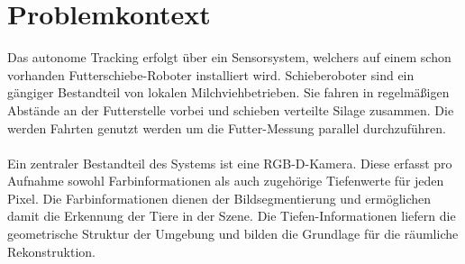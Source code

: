 \documentclass[12pt,DIV=15,BCOR=15mm,twoside,headsepline,abstract=true,listof=totoc,bibliography=totoc]{scrreprt}
\theoremstyle{remark}    %
\begin{document}
    \section{Problemkontext} \label{sec:problem}
    Das autonome Tracking erfolgt über ein Sensorsystem, welchers auf einem schon vorhanden Futterschiebe-Roboter installiert wird. Schieberoboter sind ein 
    gängiger Bestandteil von lokalen Milchviehbetrieben. Sie fahren in regelmäßigen Abstände an der Futterstelle vorbei und schieben verteilte Silage zusammen. 
    Die werden Fahrten genutzt werden um die Futter-Messung parallel durchzuführen.\\\\
    Ein zentraler Bestandteil des Systems ist eine \ac{RGB-D}-Kamera.
    Diese erfasst pro Aufnahme sowohl Farbinformationen als auch zugehörige Tiefenwerte für jeden Pixel.
    Die Farbinformationen dienen der Bildsegmentierung und ermöglichen damit die Erkennung der Tiere in der Szene.
    Die Tiefen-Informationen liefern die geometrische Struktur der Umgebung und bilden die Grundlage für die räumliche Rekonstruktion.
\end{document}
